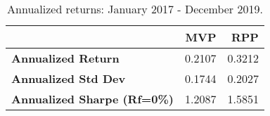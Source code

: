 \begin{table}[!htb]
	\centering
	\begingroup
	\fontsize{9}{9}
	\selectfont
	\begin{tabular}{>{}lrr}
		\toprule
		                                    & MVP    & RPP    \\
		\midrule
		\textbf{Annualized Return}          & 0.2107 & 0.3212 \\
		\textbf{Annualized Std Dev}         & 0.1744 & 0.2027 \\
		\textbf{Annualized Sharpe (Rf=0\%)} & 1.2087 & 1.5851 \\
		\bottomrule
	\end{tabular} \caption{Annualized returns: January 2017 - December 2019.}
	\label{tab:RPP1}  %
	\endgroup{}
\end{table}
